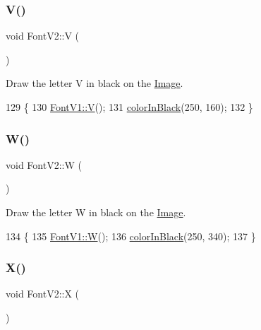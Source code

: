 \subsubsection{\texorpdfstring{V()}{V()}}
{\footnotesize\ttfamily void Font\+V2\+::V (\begin{DoxyParamCaption}{ }\end{DoxyParamCaption})}



Draw the letter V in black on the \mbox{\hyperlink{class_image}{Image}}. 


\begin{DoxyCode}
129                \{
130     \mbox{\hyperlink{class_font_v1_aa5937063bd49c25ccd8993d375926fb7}{FontV1::V}}();
131     \mbox{\hyperlink{class_font_v2_a04f2501961bc286ce70fbb6a840b0e8a}{colorInBlack}}(250, 160);
132 \}
\end{DoxyCode}
\mbox{\label{class_font_v2_abb6c182459f9a1a20c4d6a85d09b1b1d}} 
\subsubsection{\texorpdfstring{W()}{W()}}
{\footnotesize\ttfamily void Font\+V2\+::W (\begin{DoxyParamCaption}{ }\end{DoxyParamCaption})}



Draw the letter W in black on the \mbox{\hyperlink{class_image}{Image}}. 


\begin{DoxyCode}
134                \{
135     \mbox{\hyperlink{class_font_v1_aa4e67840b676dfffd3e03d873013174c}{FontV1::W}}();
136     \mbox{\hyperlink{class_font_v2_a04f2501961bc286ce70fbb6a840b0e8a}{colorInBlack}}(250, 340);
137 \}
\end{DoxyCode}
\mbox{\label{class_font_v2_a63545ba2652b9559d8d171c5bd37fbea}} 
\subsubsection{\texorpdfstring{X()}{X()}}
{\footnotesize\ttfamily void Font\+V2\+::X (\begin{DoxyParamCaption}{ }\end{DoxyParamCaption})}



